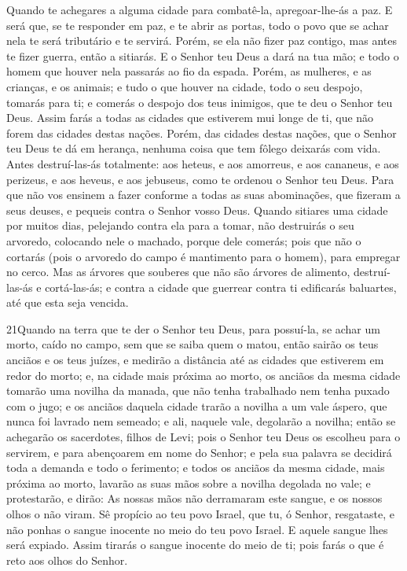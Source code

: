 Quando te achegares a alguma cidade para combatê-la,
apregoar-lhe-ás a paz. E será que, se te responder em paz, e
te abrir as portas, todo o povo que se achar nela te será tributário
e te servirá. Porém, se ela não fizer paz contigo, mas antes
te fizer guerra, então a sitiarás. E o Senhor teu Deus a dará
na tua mão; e todo o homem que houver nela passarás ao fio da
espada. Porém, as mulheres, e as crianças, e os animais; e
tudo o que houver na cidade, todo o seu despojo, tomarás para ti; e
comerás o despojo dos teus inimigos, que te deu o Senhor teu Deus.
Assim farás a todas as cidades que estiverem mui longe de ti,
que não forem das cidades destas nações. Porém, das cidades
destas nações, que o Senhor teu Deus te dá em herança, nenhuma coisa
que tem fôlego deixarás com vida. Antes destruí-las-ás
totalmente: aos heteus, e aos amorreus, e aos cananeus, e aos
perizeus, e aos heveus, e aos jebuseus, como te ordenou o Senhor teu
Deus. Para que não vos ensinem a fazer conforme a todas as
suas abominações, que fizeram a seus deuses, e pequeis contra o
Senhor vosso Deus. Quando sitiares uma cidade por muitos
dias, pelejando contra ela para a tomar, não destruirás o seu
arvoredo, colocando nele o machado, porque dele comerás; pois que
não o cortarás (pois o arvoredo do campo é mantimento para o homem),
para empregar no cerco. Mas as árvores que souberes que não
são árvores de alimento, destruí-las-ás e cortá-las-ás; e contra a
cidade que guerrear contra ti edificarás baluartes, até que esta
seja vencida.

\medskip

\lettrine{21} Quando na terra que te der o Senhor teu Deus,
para possuí-la, se achar um morto, caído no campo, sem que se saiba
quem o matou, então sairão os teus anciãos e os teus juízes, e
medirão a distância até as cidades que estiverem em redor do morto;
e, na cidade mais próxima ao morto, os anciãos da mesma cidade
tomarão uma novilha da manada, que não tenha trabalhado nem tenha
puxado com o jugo; e os anciãos daquela cidade trarão a novilha
a um vale áspero, que nunca foi lavrado nem semeado; e ali, naquele
vale, degolarão a novilha; então se achegarão os sacerdotes,
filhos de Levi; pois o Senhor teu Deus os escolheu para o servirem,
e para abençoarem em nome do Senhor; e pela sua palavra se decidirá
toda a demanda e todo o ferimento; e todos os anciãos da mesma
cidade, mais próxima ao morto, lavarão as suas mãos sobre a novilha
degolada no vale; e protestarão, e dirão: As nossas mãos não
derramaram este sangue, e os nossos olhos o não viram. Sê
propício ao teu povo Israel, que tu, ó Senhor, resgataste, e não
ponhas o sangue inocente no meio do teu povo Israel. E aquele sangue
lhes será expiado. Assim tirarás o sangue inocente do meio de
ti; pois farás o que é reto aos olhos do Senhor.

